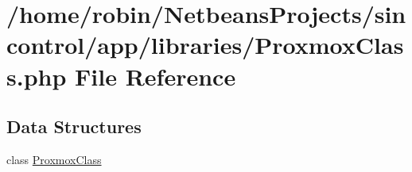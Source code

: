 \hypertarget{_proxmox_class_8php}{}\section{/home/robin/\+Netbeans\+Projects/sincontrol/app/libraries/\+Proxmox\+Class.php File Reference}
\label{_proxmox_class_8php}
\subsection*{Data Structures}
\begin{DoxyCompactItemize}
\item 
class \hyperlink{class_proxmox_class}{Proxmox\+Class}
\end{DoxyCompactItemize}
